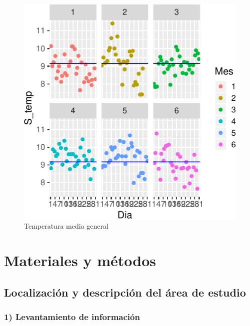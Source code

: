 \documentclass[letterpaper,9pt,twocolumn,twoside,]{pinp}
\begin{document}
\begin{figure}

{\centering \includegraphics{report_hidrolgy_files/figure-latex/unnamed-chunk-4-1} 

}

\caption{Temperatura media general}\label{fig:unnamed-chunk-4}
\end{figure}

\hypertarget{materiales-y-muxe9todos}{%
\section{Materiales y métodos}\label{materiales-y-muxe9todos}}

\hypertarget{localizaciuxf3n-y-descripciuxf3n-del-uxe1rea-de-estudio}{%
\subsection{Localización y descripción del área de
estudio}\label{localizaciuxf3n-y-descripciuxf3n-del-uxe1rea-de-estudio}}

\hypertarget{levantamiento-de-informaciuxf3n}{%
\subsubsection{1) Levantamiento de
información}\label{levantamiento-de-informaciuxf3n}}
\end{document}
